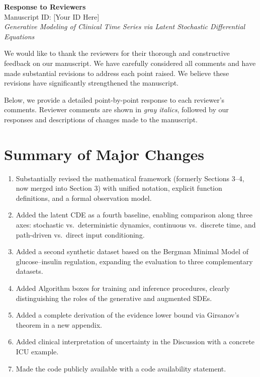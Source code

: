 \documentclass[12pt]{article}
\begin{document}
\begin{center}
{\LARGE \textbf{Response to Reviewers}}\\[0.8cm]
Manuscript ID: [Your ID Here]\\[0.3cm]
\textit{Generative Modeling of Clinical Time Series via Latent Stochastic Differential Equations}
\end{center}

\vspace{0.8cm}

We would like to thank the reviewers for their thorough and constructive feedback on our manuscript. We have carefully considered all comments and have made substantial revisions to address each point raised. We believe these revisions have significantly strengthened the manuscript.

Below, we provide a detailed point-by-point response to each reviewer's comments. Reviewer comments are shown in \textcolor{reviewergray}{\textit{gray italics}}, followed by our responses and descriptions of changes made to the manuscript.

\section*{Summary of Major Changes}

\begin{enumerate}[leftmargin=2em]
\item Substantially revised the mathematical framework (formerly Sections 3--4, now merged into Section 3) with unified notation, explicit function definitions, and a formal observation model.
\item Added the latent CDE as a fourth baseline, enabling comparison along three axes: stochastic vs.\ deterministic dynamics, continuous vs.\ discrete time, and path-driven vs.\ direct input conditioning.
\item Added a second synthetic dataset based on the Bergman Minimal Model of glucose--insulin regulation, expanding the evaluation to three complementary datasets.
\item Added Algorithm boxes for training and inference procedures, clearly distinguishing the roles of the generative and augmented SDEs.
\item Added a complete derivation of the evidence lower bound via Girsanov's theorem in a new appendix.
\item Added clinical interpretation of uncertainty in the Discussion with a concrete ICU example.
\item Made the code publicly available with a code availability statement.
\end{enumerate}
\end{document}
